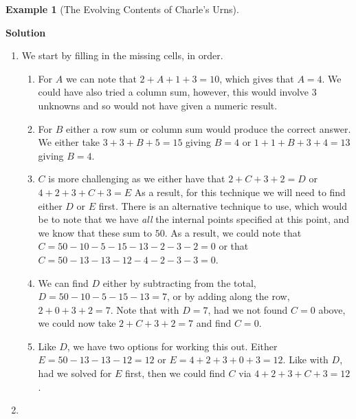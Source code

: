 \documentclass[
  letterpaper,
  DIV=11,
  numbers=noendperiod]{scrreprt}
\theoremstyle{definition}
\theoremstyle{definition}
\newtheorem{example}{Example}[chapter]
\theoremstyle{definition}
\theoremstyle{remark}
\begin{document}
\begin{example}[The Evolving Contents of Charle's
Urns]
\begin{tcolorbox}[enhanced jigsaw, colback=white, colframe=quarto-callout-color-frame, arc=.35mm, leftrule=.75mm, rightrule=.15mm, opacityback=0, breakable, bottomrule=.15mm, left=2mm, toprule=.15mm]

\vspace{-3mm}\textbf{Solution}\vspace{3mm}

\begin{enumerate}
\def\labelenumi{\alph{enumi}.}
\item
  We start by filling in the missing cells, in order.

  \begin{enumerate}
  \def\labelenumii{\roman{enumii}.}
  \item
    For \(A\) we can note that \(2 + A + 1 + 3 = 10\), which gives that
    \(A = 4\). We could have also tried a column sum, however, this
    would involve \(3\) unknowns and so would not have given a numeric
    result.
  \item
    For \(B\) either a row sum or column sum would produce the correct
    answer. We either take \(3 + 3 + B + 5 = 15\) giving \(B = 4\) or
    \(1 + 1 + B + 3 + 4 = 13\) giving \(B=4\).
  \item
    \(C\) is more challenging as we either have that
    \(2 + C + 3 + 2 = D\) or \(4 + 2 + 3 + C + 3 = E\)\footnotemark{} As
    a result, for this technique we will need to find either \(D\) or
    \(E\) first. There is an alternative technique to use, which would
    be to note that we have \emph{all} the internal points specified at
    this point, and we know that these sum to \(50\). As a result, we
    could note that \(C = 50 - 10 - 5 - 15 - 13 - 2 - 3 - 2 = 0\) or
    that \(C =  50 - 13 - 13 - 12 - 4 - 2 - 3 - 3 = 0\).
  \item
    We can find \(D\) either by subtracting from the total,
    \(D = 50 - 10 - 5 - 15 - 13 = 7\), or by adding along the row,
    \(2 + 0 + 3 + 2 = 7\).\footnotemark{} Note that with \(D = 7\), had
    we not found \(C = 0\) above, we could now take
    \(2 + C + 3 + 2 = 7\) and find \(C = 0\).
  \item
    Like \(D\), we have two options for working this out. Either
    \(E = 50 - 13 - 13 - 12 = 12\) or
    \(E = 4 + 2 + 3 + 0 + 3 = 12\).\footnotemark{} Like with \(D\), had
    we solved for \(E\) first, then we could find \(C\) via
    \(4 + 2 + 3 + C + 3 = 12\).
  \end{enumerate}
\item

\end{enumerate}
\end{tcolorbox}
\end{example}
\end{document}
